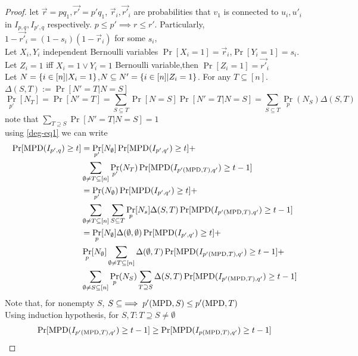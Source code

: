 \begin{proof}
	let $\vec{r}=pq_1,\vec{r'}=p'q_1$, $\vec{r}_i,\vec{r'}_i$ are probabilities that $v_1$ is connected to $u_i,u'_i$ in $I_{p,q},I_{p',q}$ respectively. $p\leq p'\implies r\leq r'$. Particularly, $1-\vec{r'}_i=(1-s_i)(1-\vec{r}_i)$ for some $s_i$,\\ 
	Let $X_i,Y_i$ independent Bernoulli variables $\Pr[X_i=1]=\vec{r}_i$,$\Pr[Y_i=1]=s_i$.\\
	Let $Z_i=1$ iff $X_i=1\lor Y_i=1$ Bernoulli variable,then $\Pr[Z_i=1]=\vec{r'}_i$\\
	Let $N=\{i\in[n]|X_i=1\}$,$N\subseteq N'=\{i\in[n]|Z_i=1\}$. For any $T\subseteq[n]$.
	$\Delta(S,T):=\Pr[N'=T|N=S]$
	\begin{equation*}
		\Pr_{p'}[N_T]=\Pr[N'=T]=\sum\limits_{S\subseteq T}\Pr[N=S]\Pr[N'=T|N=S]=\sum\limits_{S\subseteq T}\Pr_p(N_S)\Delta(S,T)
	\end{equation*}
	note that $\sum\limits_{T\supseteq S}\Pr[N'=T|N=S]=1$\\
	using \autoref{deg-eq1} we can write
	\begin{equation}\begin{aligned}[b]
		\label{deg-eq2}
		\Pr[\mathrm{MPD}(I_{p',q})\geq t] &= \Pr_{p'}[N_{\emptyset}]\Pr[\mathrm{MPD}(I_{p',q'})\geq t]+\\&
		\sum\limits_{\emptyset\neq T\subseteq[n]}\Pr_{p'}(N_T)\Pr[\mathrm{MPD}(I_{p'(\mathrm{MPD},T),q'})\geq t-1]\\
		&= \Pr_{p'}(N_{\emptyset})\Pr[\mathrm{MPD}(I_{p',q'})\geq t]+ \\&
		\sum\limits_{\emptyset\neq T\subseteq[n]}\sum\limits_{S\subseteq T}\Pr_p[N_s]\Delta(S,T)\Pr[\mathrm{MPD}(I_{p'(\mathrm{MPD},T),q'})\geq t-1]\\
		&=\Pr_p[N_{\emptyset}]\Delta(\emptyset,\emptyset)\Pr[\mathrm{MPD}(I_{p',q'})\geq t]+\\&
		\Pr_p[N_{\emptyset}]\sum\limits_{\emptyset\neq T\subseteq[n]}\Delta(\emptyset,T)\Pr[\mathrm{MPD}(I_{p'(\mathrm{MPD},T),q'})\geq t-1]+\\&
		\sum\limits_{\emptyset\neq S\subseteq[n]}\Pr_p(N_S)\sum\limits_{T\supseteq S}\Delta(S,T)\Pr[\mathrm{MPD}(I_{p'(\mathrm{MPD},T),q'})\geq t-1]
	\end{aligned}\end{equation}
	Note that, for nonempty $S$, $S\subseteq\implies p'(\mathrm{MPD},S)\leq p'(\mathrm{MPD},T)$\\
	Using induction hypothesis, for $S,T: T\supseteq S\neq\emptyset$
	\begin{equation}\begin{aligned}[b]
	\Pr[\MPD(I_{p'(\MPD,T),q'})\geq t-1]\geq\Pr[\MPD(I_{p(\MPD,T),q'})\geq t-1]		

\end{aligned}
\end{equation}
\end{proof}
